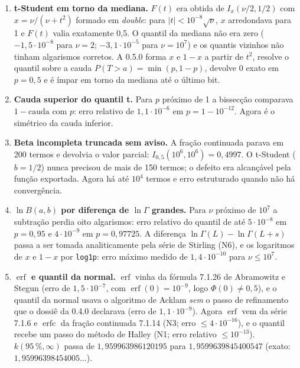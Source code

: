 \documentclass[11pt,a4paper]{article}
\newcommand{\docVersion}{0.5.0}
\newcommand{\previousVersion}{0.4.0}
\begin{document}
\begin{enumerate}[label=(\alph*)]
  \item \textbf{t-Student em torno da mediana.} \(F(t)\) era obtida de \(I_x(\nu/2, 1/2)\) com \(x = \nu/(\nu + t^2)\) formado em \emph{double}: para \(|t| < 10^{-8}\sqrt{\nu}\), \(x\) arredondava para 1 e \(F(t)\) valia exatamente 0,5. O quantil da mediana não era zero (\(-1{,}5 \cdot 10^{-8}\) para \(\nu = 2\); \(-3{,}1 \cdot 10^{-5}\) para \(\nu = 10^7\)) e os quantis vizinhos não tinham algarismos corretos. A \docVersion{} forma \(x\) e \(1 - x\) a partir de \(t^2\), resolve o quantil sobre a cauda \(P(T > a) = \min(p, 1 - p)\), devolve 0 exato em \(p = 0{,}5\) e é ímpar em torno da mediana até o último bit.
  \item \textbf{Cauda superior do quantil t.} Para \(p\) próximo de 1 a bissecção comparava \(1 - \text{cauda}\) com \(p\): erro relativo de \(1{,}1 \cdot 10^{-6}\) em \(p = 1 - 10^{-12}\). Agora é o simétrico da cauda inferior.
  \item \textbf{Beta incompleta truncada sem aviso.} A fração continuada parava em 200 termos e devolvia o valor parcial: \(I_{0,5}(10^6, 10^6) = 0{,}4997\). O t-Student (\(b = 1/2\)) nunca precisou de mais de 150 termos; o defeito era alcançável pela função exportada. Agora há até \(10^4\) termos e erro estruturado quando não há convergência.
  \item \textbf{\(\ln B(a, b)\) por diferença de \(\ln\Gamma\) grandes.} Para \(\nu\) próximo de \(10^7\) a subtração perdia oito algarismos: erro relativo do quantil de até \(5 \cdot 10^{-8}\) em \(p = 0{,}95\) e \(4 \cdot 10^{-9}\) em \(p = 0{,}97725\). A diferença \(\ln\Gamma(L) - \ln\Gamma(L + s)\) passa a ser tomada analiticamente pela série de Stirling (N6), e os logaritmos de \(x\) e \(1 - x\) por \texttt{log1p}: erro máximo medido de \(1{,}4 \cdot 10^{-10}\) para \(\nu \leq 10^7\).
  \item \textbf{\(\operatorname{erf}\) e quantil da normal.} \(\operatorname{erf}\) vinha da fórmula 7.1.26 de Abramowitz e Stegun (erro de \(1{,}5 \cdot 10^{-7}\), com \(\operatorname{erf}(0) = 10^{-9}\), logo \(\Phi(0) \neq 0{,}5\)), e o quantil da normal usava o algoritmo de Acklam \emph{sem} o passo de refinamento que o dossiê da \previousVersion{} declarava (erro de \(1{,}1 \cdot 10^{-9}\)). Agora \(\operatorname{erf}\) vem da série 7.1.6 e \(\operatorname{erfc}\) da fração continuada 7.1.14 (N3; erro \(\leq 4 \cdot 10^{-16}\)), e o quantil recebe um passo do método de Halley (N1; erro relativo \(\leq 10^{-13}\)). \(k(95\,\%, \infty)\) passa de \(1{,}959963986120195\) para \(1{,}9599639845400547\) (exato: \(1{,}95996398454005\ldots\)).

\end{enumerate}
\end{document}
